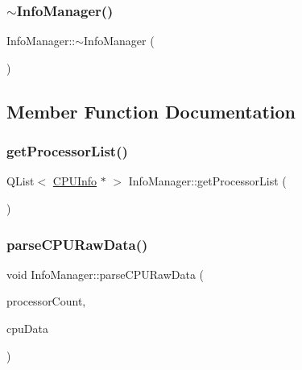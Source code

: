 \mbox{\label{class_info_manager_ae53b7e0f0a345170596d6e17198261bf}} 
\subsubsection{\texorpdfstring{$\sim$\+Info\+Manager()}{~InfoManager()}}
{\footnotesize\ttfamily Info\+Manager\+::$\sim$\+Info\+Manager (\begin{DoxyParamCaption}{ }\end{DoxyParamCaption})}



\subsection{Member Function Documentation}
\mbox{\label{class_info_manager_af5c7c292bc2e1b13b4ef8fb441b2ca2b}} 
\subsubsection{\texorpdfstring{get\+Processor\+List()}{getProcessorList()}}
{\footnotesize\ttfamily Q\+List$<$ \hyperlink{class_c_p_u_info}{C\+P\+U\+Info} $\ast$ $>$ Info\+Manager\+::get\+Processor\+List (\begin{DoxyParamCaption}{ }\end{DoxyParamCaption})}

\mbox{\label{class_info_manager_a13e29dc9ebb100b5ab8b640207f4401c}} 
\subsubsection{\texorpdfstring{parse\+C\+P\+U\+Raw\+Data()}{parseCPURawData()}}
{\footnotesize\ttfamily void Info\+Manager\+::parse\+C\+P\+U\+Raw\+Data (\begin{DoxyParamCaption}\item[{qint32}]{processor\+Count,  }\item[{const Q\+String \&}]{cpu\+Data }\end{DoxyParamCaption})}



